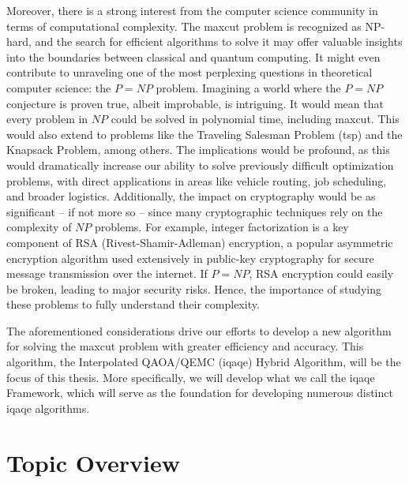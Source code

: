 Moreover, there is a strong interest from the computer science community in terms of computational complexity. The \acrshort{maxcut} problem is recognized as NP-hard, and the search for efficient algorithms to solve it may offer valuable insights into the boundaries between classical and quantum computing. It might even contribute to unraveling one of the most perplexing questions in theoretical computer science: the $P = NP$ problem. Imagining a world where the $P = NP$ conjecture is proven true, albeit improbable, is intriguing. It would mean that every problem in $NP$ could be solved in polynomial time, including \acrshort{maxcut}. This would also extend to problems like the Traveling Salesman Problem (\acrshort{tsp}) and the Knapsack Problem, among others. The implications would be profound, as this would dramatically increase our ability to solve previously difficult optimization problems, with direct applications in areas like vehicle routing, job scheduling, and broader logistics. Additionally, the impact on cryptography would be as significant – if not more so – since many cryptographic techniques rely on the complexity of $NP$ problems. For example, integer factorization is a key component of RSA (Rivest-Shamir-Adleman) encryption, a popular asymmetric encryption algorithm used extensively in public-key cryptography for secure message transmission over the internet. If $P = NP$, RSA encryption could easily be broken, leading to major security risks. Hence, the importance of studying these problems to fully understand their complexity.

The aforementioned considerations drive our efforts to develop a new algorithm for solving the \acrshort{maxcut} problem with greater efficiency and accuracy. This algorithm, the Interpolated QAOA/QEMC (\acrshort{iqaqe}) Hybrid Algorithm, will be the focus of this thesis. More specifically, we will develop what we call the \acrshort{iqaqe} Framework, which will serve as the foundation for developing numerous distinct \acrshort{iqaqe} algorithms.


\section{Topic Overview}
\label{section:overview}


